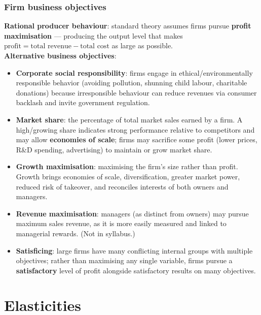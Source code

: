 \documentclass[a4paper,12pt]{article}
\begin{document}
\subsubsection*{Firm business objectives}
\textbf{Rational producer behaviour}: standard theory assumes firms pursue \textbf{profit maximisation} --- producing the output level that makes $\text{profit} = \text{total revenue} - \text{total cost}$ as large as possible.
\\
\textbf{Alternative business objectives}:
\begin{itemize}
  \item \textbf{Corporate social responsibility}: firms engage in ethical/environmentally responsible behavior (avoiding pollution, shunning child labour, charitable donations) because irresponsible behaviour can reduce revenues via consumer backlash and invite government regulation.
  \item \textbf{Market share}: the percentage of total market sales earned by a firm. A high/growing share indicates strong performance relative to competitors and may allow \textbf{economies of scale}; firms may sacrifice some profit (lower prices, R\&D spending, advertising) to maintain or grow market share.
  \item \textbf{Growth maximisation}: maximising the firm's size rather than profit. Growth brings economies of scale, diversification, greater market power, reduced risk of takeover, and reconciles interests of both owners and managers.
  \item \textbf{Revenue maximisation}: managers (as distinct from owners) may pursue maximum sales revenue, as it is more easily measured and linked to managerial rewards. (Not in syllabus.)
  \item \textbf{Satisficing}: large firms have many conflicting internal groups with multiple objectives; rather than maximising any single variable, firms pursue a \textbf{satisfactory} level of profit alongside satisfactory results on many objectives.
\end{itemize}
\section{Elasticities}\label{sec:elasticities}
\end{document}
